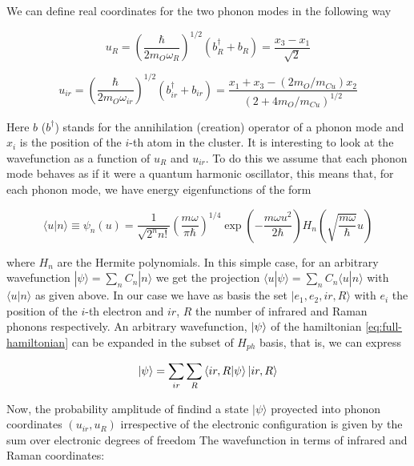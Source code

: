 We can define real coordinates for the two phonon modes in the following way \cite{MustredeLeon1992}

\begin{equation}\label{eq:uR}
u_R = \left(\frac{\hbar}{2 m_O \omega_R}\right)^{1/2}(b_R^\dagger + b_R) = \frac{x_3 - x_1}{\sqrt{2}}
\end{equation}

\begin{equation}\label{uir}
u_{ir} = \left(\frac{\hbar}{2 m_O \omega_{ir}}\right)^{1/2}(b^\dagger_{ir}+b_{ir}) = \frac{ x_1 + x_3 - ( 2 m_O/m_{Cu})x_2}{(2 + 4 m_O/m_{Cu})^{1/2}}
\end{equation}

Here $b$ ($b^\dagger$) stands for the annihilation (creation) operator of a phonon mode and $x_i$ is the position of the $i$-th atom in the cluster. 
It is interesting to look at the wavefunction as a function of $u_R$ and $u_{ir}$.
To do this we assume that each phonon mode behaves as if it were a quantum harmonic oscillator, this means that, for each phonon mode, we have energy eigenfunctions of the form

\begin{equation}\label{eq:harmOscProj}
\langle u | n \rangle \equiv \psi_n(u) = \frac{1}{\sqrt{2^n n!}} \left(\frac{m \omega}{\pi \hbar}\right)^{1/4}
\exp\left(-\frac{m \omega u^2}{2 \hbar}\right) H_n\left( \sqrt{\frac{m \omega}{\hbar}} u \right) 
\end{equation}

\noindent where $H_n$ are the Hermite polynomials. 
In this simple case, for an arbitrary wavefunction $ | \psi \rangle = \sum_n C_n |n \rangle$ we get the projection $ \langle u | \psi \rangle = \sum_n C_n \langle u | n \rangle$ with $\langle u | n \rangle$ as given above. 
In our case we have as basis the set ${| e_1, e_2, ir, R \rangle}$ with $e_i$ the position of the $i$-th electron and $ir$, $R$ the number of infrared and Raman phonons respectively. 
An arbitrary wavefunction, $\left | \psi \right\rangle$ of the hamiltonian \ref{eq:full-hamiltonian} can be expanded in the subset of $H_{ph}$ basis, that is, we can express

\begin{equation}\label{eq:wf-phonon-base}
\left | \psi \right\rangle=\sum_{ir} \sum_R \left\langle ir,R|\psi\right\rangle\left | ir,R \right\rangle
\end{equation}

Now, the probability amplitude of findind a state $|\psi\rangle$ proyected into phonon coordinates $(u_{ir},u_R)$ irrespective of the electronic configuration is given by the sum over electronic degrees of freedom The wavefunction in terms of infrared and Raman coordinates:

